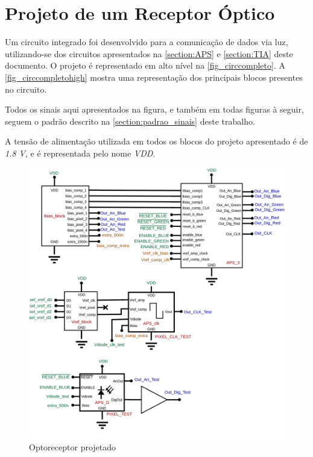 \section[Projeto de um Receptor Óptico]{Projeto de um Receptor Óptico}
\label{sec_circ_comp}

Um circuito integrado foi desenvolvido para a comunicação de dados via luz, utilizando-se dos circuitos apresentados na \autoref{section:APS} e \autoref{section:TIA} deste documento. O projeto \'e representado em alto n\'ivel na \autoref{fig_circcompleto}. A \autoref{fig_circcompletohigh} mostra uma representação dos principais blocos presentes no circuito.

Todos os sinais aqui apresentados na figura, e tamb\'em em todas figuras \`a seguir, seguem o padrão descrito na \autoref{section:padrao_sinais} deste trabalho.

A tensão de alimentação utilizada em todos os blocos do projeto apresentado é de \textit{1.8 V}, e é representada pelo nome \textit{VDD}.

\begin{figure}[!h]
    	\caption{\label{fig_circcompleto}Optoreceptor projetado}
	\begin{center}
	    \includegraphics[width=\textwidth]{Circuitos/Complete_Circuit.png}
	\end{center}
\end{figure}

